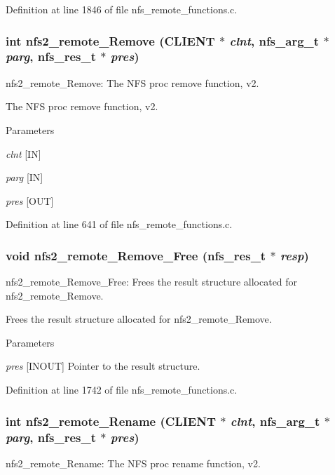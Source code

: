 Definition at line 1846 of file nfs\_\-remote\_\-functions.c.
\subsubsection[{nfs2\_\-remote\_\-Remove}]{\setlength{\rightskip}{0pt plus 5cm}int nfs2\_\-remote\_\-Remove (CLIENT $\ast$ {\em clnt}, \/  nfs\_\-arg\_\-t $\ast$ {\em parg}, \/  nfs\_\-res\_\-t $\ast$ {\em pres})}\label{group__NFSprocs_gacf4d75778b0bbfcf4a232b6a0dd09d20}
nfs2\_\-remote\_\-Remove: The NFS proc remove function, v2.

The NFS proc remove function, v2.


\begin{DoxyParams}{Parameters}
\item[{\em clnt}][IN] \item[{\em parg}][IN] \item[{\em pres}][OUT] \end{DoxyParams}


Definition at line 641 of file nfs\_\-remote\_\-functions.c.
\subsubsection[{nfs2\_\-remote\_\-Remove\_\-Free}]{\setlength{\rightskip}{0pt plus 5cm}void nfs2\_\-remote\_\-Remove\_\-Free (nfs\_\-res\_\-t $\ast$ {\em resp})}\label{group__NFSprocs_gae159e5f39aa0b8634ff833e7c1cd3491}
nfs2\_\-remote\_\-Remove\_\-Free: Frees the result structure allocated for nfs2\_\-remote\_\-Remove.

Frees the result structure allocated for nfs2\_\-remote\_\-Remove.


\begin{DoxyParams}{Parameters}
\item[{\em pres}][INOUT] Pointer to the result structure. \end{DoxyParams}


Definition at line 1742 of file nfs\_\-remote\_\-functions.c.
\subsubsection[{nfs2\_\-remote\_\-Rename}]{\setlength{\rightskip}{0pt plus 5cm}int nfs2\_\-remote\_\-Rename (CLIENT $\ast$ {\em clnt}, \/  nfs\_\-arg\_\-t $\ast$ {\em parg}, \/  nfs\_\-res\_\-t $\ast$ {\em pres})}\label{group__NFSprocs_ga4e6b032d4495a4d6c510c4b244316d09}
nfs2\_\-remote\_\-Rename: The NFS proc rename function, v2.

